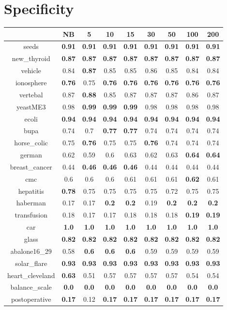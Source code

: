 \documentclass{article}%
\begin{document}
%
\section*{Specificity}%
\begin{tabular}{c|cccccccc}%
\hline%
&NB&5&10&15&30&50&100&200\\%
\hline%
seeds&\textbf{0.91}&\textbf{0.91}&\textbf{0.91}&\textbf{0.91}&\textbf{0.91}&\textbf{0.91}&\textbf{0.91}&\textbf{0.91}\\%
new\_thyroid&\textbf{0.87}&\textbf{0.87}&\textbf{0.87}&\textbf{0.87}&\textbf{0.87}&\textbf{0.87}&\textbf{0.87}&\textbf{0.87}\\%
vehicle&0.84&\textbf{0.87}&0.85&0.85&0.86&0.85&0.84&0.84\\%
ionosphere&\textbf{0.76}&0.75&\textbf{0.76}&\textbf{0.76}&\textbf{0.76}&\textbf{0.76}&\textbf{0.76}&\textbf{0.76}\\%
vertebal&0.87&\textbf{0.88}&0.85&0.87&0.87&0.87&0.86&0.87\\%
yeastME3&0.98&\textbf{0.99}&\textbf{0.99}&\textbf{0.99}&0.98&0.98&0.98&0.98\\%
ecoli&\textbf{0.94}&\textbf{0.94}&\textbf{0.94}&\textbf{0.94}&\textbf{0.94}&\textbf{0.94}&\textbf{0.94}&\textbf{0.94}\\%
bupa&0.74&0.7&\textbf{0.77}&\textbf{0.77}&0.74&0.74&0.74&0.74\\%
horse\_colic&0.75&\textbf{0.76}&0.75&0.75&\textbf{0.76}&0.74&0.74&0.74\\%
german&0.62&0.59&0.6&0.63&0.62&0.63&\textbf{0.64}&\textbf{0.64}\\%
breast\_cancer&0.44&\textbf{0.46}&\textbf{0.46}&\textbf{0.46}&0.44&0.44&0.44&0.44\\%
cmc&0.6&0.6&0.6&0.61&0.61&0.61&\textbf{0.62}&0.61\\%
hepatitis&\textbf{0.78}&0.75&0.75&0.75&0.75&0.72&0.75&0.75\\%
haberman&0.17&0.17&\textbf{0.2}&\textbf{0.2}&0.19&\textbf{0.2}&\textbf{0.2}&\textbf{0.2}\\%
transfusion&0.18&0.17&0.17&0.18&0.18&0.18&\textbf{0.19}&\textbf{0.19}\\%
car&\textbf{1.0}&\textbf{1.0}&\textbf{1.0}&\textbf{1.0}&\textbf{1.0}&\textbf{1.0}&\textbf{1.0}&\textbf{1.0}\\%
glass&\textbf{0.82}&\textbf{0.82}&\textbf{0.82}&\textbf{0.82}&\textbf{0.82}&\textbf{0.82}&\textbf{0.82}&\textbf{0.82}\\%
abalone16\_29&0.58&\textbf{0.6}&\textbf{0.6}&\textbf{0.6}&0.59&0.59&0.59&0.59\\%
solar\_flare&\textbf{0.93}&\textbf{0.93}&\textbf{0.93}&\textbf{0.93}&\textbf{0.93}&\textbf{0.93}&\textbf{0.93}&\textbf{0.93}\\%
heart\_cleveland&\textbf{0.63}&0.51&0.57&0.57&0.57&0.57&0.54&0.54\\%
balance\_scale&\textbf{0.0}&\textbf{0.0}&\textbf{0.0}&\textbf{0.0}&\textbf{0.0}&\textbf{0.0}&\textbf{0.0}&\textbf{0.0}\\%
postoperative&\textbf{0.17}&0.12&\textbf{0.17}&\textbf{0.17}&\textbf{0.17}&\textbf{0.17}&\textbf{0.17}&\textbf{0.17}\\%
\end{tabular}
\end{document}
